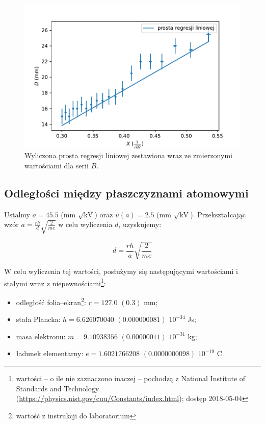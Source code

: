 \documentclass[a4paper]{article}
\newlength{\du}
\begin{document}
\begin{figure}[h]
\centering
\includegraphics[scale=0.7]{wykres_B.pdf}
\caption{Wyliczona prosta regresji liniowej zestawiona wraz ze zmierzonymi wartościami dla serii $B$.}
\label{wykres_B}
\end{figure}

\subsection{Odległości między płaszczyznami atomowymi}

Ustalmy $a = 45.5$ (mm $\sqrt{\text{kV}}$) oraz $u(a) = 2.5$ (mm $\sqrt{\text{kV}}$).
Przekształcając wzór $a = \frac{rh}{d} \sqrt{\frac{2}{me}}$ w celu wyliczenia $d$, uzyskujemy:

$$d = \frac{rh}{a} \sqrt{\frac{2}{me}}$$

W celu wyliczenia tej wartości, posłużymy się następującymi wartościami i stałymi wraz z niepewnościami\footnote{wartości -- o ile nie zaznaczono inaczej -- pochodzą z National Institute of Standards and Technology (\url{https://physics.nist.gov/cuu/Constants/index.html}); dostęp 2018-05-04}:

\begin{itemize}
	\item odległość folia--ekran\footnote{wartość z instrukcji do laboratorium}: $r = 127.0$ $(0.3)$ mm;
	\item stała Plancka: $h = 6.626 070 040$ $(0.000 000 081)$ $10^{-34}$ Js;
	\item masa elektronu: $m = 9.109 383 56$ $(0.000 000 11)$ $10^{-31}$ kg;
	\item ładunek elementarny: $e = 1.602 176 6208$ $(0.000 000 0098)$ $10^{-19}$ C.
\end{itemize}
\end{document}
